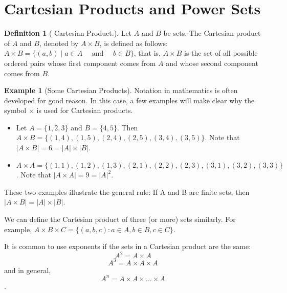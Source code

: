 \documentclass[10pt,]{book}
\theoremstyle{plain}
\theoremstyle{definition}
\newtheorem{definition}[theorem]{Definition}
\newtheorem{example}[theorem]{Example}
\begin{document}
\section[Cartesian Products and Power Sets]{Cartesian Products and Power Sets}\label{Cartesian_Products_and_Power_Sets}
\begin{definition}[ Cartesian Product.]\label{cartesian-product.}
 Let \(A\) and \(B\) be sets. The Cartesian product of \(A\) and \(B\), denoted by \(A\times B\), is defined as follows: \(A\times B = \{(a, b) \mid a \in  A \quad\textrm{ and }\quad b \in  B\}\), that is, \(A\times B\) is the set of all possible ordered pairs whose first component comes from \(A\) and whose second component comes from \(B\).
 \end{definition}
\begin{example}[Some Cartesian Products]\label{example-8}
 Notation in mathematics is often developed for good reason. In this case, a few examples will make clear why the symbol $\times $ is used for Cartesian products.%
\leavevmode%
\begin{itemize}[label=\textbullet]
\item{}  Let \(A = \{1, 2, 3\}\) and \(B = \{4, 5\}\). Then \(A \times  B = \{(1, 4), (1, 5), (2, 4), (2, 5), (3, 4), (3, 5)\}\). Note that \(|A \times B| = 6 = \lvert A \rvert  \times  \lvert B \rvert \). \item{}  \(A \times  A = \{(1, 1), (1, 2), (1, 3), (2, 1), (2, 2), (2, 3), (3, 1), (3, 2), (3, 3)\}\). Note that \(|A \times  A| = 9 = {\lvert A \rvert}^2\).\end{itemize}
\end{example}
These two examples illustrate the general rule: If A and B are finite sets, then \(| A \times B | = \lvert A \rvert  \times  \lvert B \rvert \).%
\par
We can define the Cartesian product of three (or more) sets similarly. For example, \(A \times  B \times  C = \{(a, b, c):a \in  A, b \in  B, c \in C\}\). %
\par
It is common to use exponents if the sets in a Cartesian product are the same: 
\[A^2= A \times  A\]
\[A^3=A \times A \times A\]
and in general, 
\[A^n =A \times A \times \ldots \times A\].%
\typeout{************************************************}
\typeout{************************************************}
\end{document}
